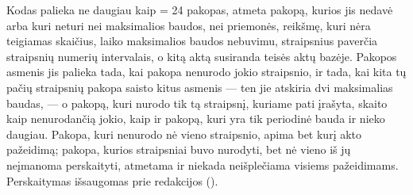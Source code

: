 Kodas palieka ne daugiau kaip  = 24 pakopas, atmeta pakopą, kurios
 jis nedavė arba kuri neturi nei maksimalios baudos, nei priemonės, reikšmę,
kuri nėra teigiamas skaičius, laiko maksimalios baudos nebuvimu, straipsnius paverčia straipsnių
numerių intervalais, o kitą aktą susiranda teisės aktų bazėje. Pakopos asmenis jis palieka
tada, kai pakopa nenurodo jokio straipsnio, ir tada, kai kita tų pačių straipsnių pakopa saisto
kitus asmenis --- ten jie atskiria dvi maksimalias baudas, --- o pakopą, kuri nurodo tik tą
straipsnį, kuriame pati įrašyta, skaito kaip nenurodančią jokio, kaip ir pakopą, kuri yra tik
periodinė bauda ir nieko daugiau. Pakopa, kuri nenurodo nė vieno
straipsnio, apima bet kurį akto pažeidimą; pakopa, kurios straipsniai buvo nurodyti, bet nė
vieno iš jų neįmanoma perskaityti, atmetama ir niekada neišplečiama visiems pažeidimams.
Perskaitymas išsaugomas prie redakcijos ().

